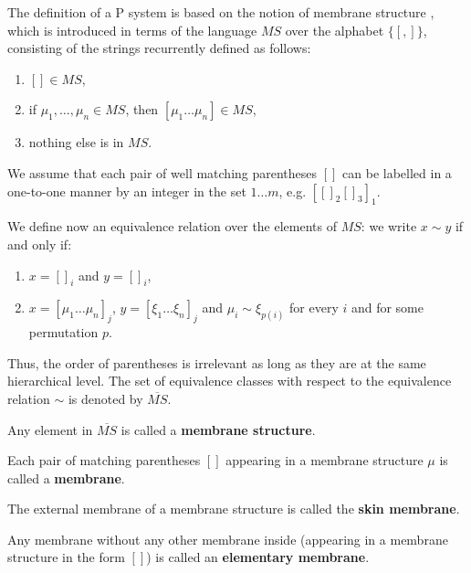 The definition of a P system is based on the notion of membrane structure \cite{Besozzi:PhD:2004}, which is introduced in terms of the language $MS$ over the alphabet $\{[, ]\}$, consisting of the strings recurrently defined as follows:
\begin{enumerate}
  \item $[]\in MS$,
  \item if $\mu_1, \ldots, \mu_n \in MS$, then $[\mu_1\ldots\mu_n] \in MS$,
  \item nothing else is in $MS$.
\end{enumerate}

We assume that each pair of well matching parentheses $[]$ can be labelled in a one-to-one manner by an integer in the set $1\ldots m$, e.g. $[[]_2[]_3]_1$.

We define now an equivalence relation over the elements of $MS$: we write $x\sim y$ if and only if:
\begin{enumerate}
  \item $x=[]_i$ and $y=[]_i$,
  \item $x=[\mu_1\ldots\mu_n]_j$, $y=[\xi_1\ldots\xi_n]_j$ and $\mu_i\sim\xi_{p(i)}$ for every $i$ and for some permutation $p$.
\end{enumerate}

Thus, the order of parentheses is irrelevant as long as they are at the same hierarchical level. The set of equivalence classes with respect to the equivalence relation $\sim$ is denoted by $\overline{MS}$.

\begin{definition}
  Any element in $\overline{MS}$ is called a {\bf membrane structure}.
\end{definition}

\begin{definition}
  Each pair of matching parentheses $[]$ appearing in a membrane structure $\mu$ is called a {\bf membrane}.
\end{definition}

\begin{definition}
  The external membrane of a membrane structure is called the {\bf skin membrane}.
\end{definition}

\begin{definition}
  Any membrane without any other membrane inside (appearing in a membrane structure in the form $[]$) is called an {\bf elementary membrane}.
\end{definition}

